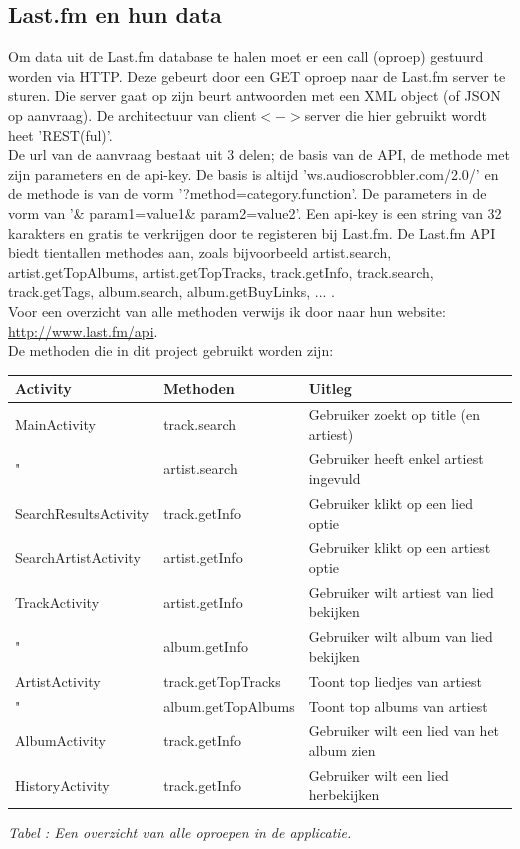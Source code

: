 \documentclass[11pt,a4paper]{article}
\newcounter{tabc}
\newcommand{\increaseTabID} {%
   \stepcounter{tabc}%
   \thetabc}
\newcommand{\tabID}[1]{\small \textit{Tabel \increaseTabID : #1} \\ \normalsize}
\begin{document}
		
			\subsection{Last.fm en hun data}
	\label{sec:Tracks omzetten}
	
Om data uit de Last.fm database te halen moet er een call (oproep) gestuurd worden via HTTP. Deze gebeurt door een GET oproep naar de Last.fm server te sturen. Die server gaat op zijn beurt antwoorden met een XML object (of JSON op aanvraag). De architectuur van client$<->$server die hier gebruikt wordt heet 'REST(ful)'. \\

De url van de aanvraag bestaat uit 3 delen; de basis van de API, de methode met zijn parameters en de api-key. De basis is altijd 'ws.audioscrobbler.com/2.0/' en de methode is van de vorm '?method=category.function'. De parameters in de vorm van '\& param1=value1\& param2=value2'. Een api-key is een string van 32 karakters en gratis te verkrijgen door te registeren bij Last.fm.
De Last.fm API biedt tientallen methodes aan, zoals bijvoorbeeld artist.search, artist.getTopAlbums, artist.getTopTracks, track.getInfo, track.search, track.getTags, album.search, album.getBuyLinks, ... . \\
Voor een overzicht van alle methoden verwijs ik door naar hun website: \url{http://www.last.fm/api}. \\ 

De methoden die in dit project gebruikt worden zijn: \\

\hspace{-3em} \begin{tabular}{| l | l | l |}
\hline
	Activity 				&	Methoden			& Uitleg \\ \hline
	MainActivity			&	track.search 		& Gebruiker zoekt op title (en artiest) \\
	"						&	artist.search 		& Gebruiker heeft enkel artiest ingevuld \\ \hline
	SearchResultsActivity	&	track.getInfo		& Gebruiker klikt op een lied optie \\ \hline
	SearchArtistActivity	&	artist.getInfo		& Gebruiker klikt op een artiest optie \\ \hline
	TrackActivity			&	artist.getInfo		& Gebruiker wilt artiest van lied bekijken \\
	"						&	album.getInfo		& Gebruiker wilt album van lied bekijken \\ \hline
	ArtistActivity			&	track.getTopTracks	& Toont top liedjes van artiest \\
	"						&	album.getTopAlbums	& Toont top albums van artiest  \\ \hline
	AlbumActivity			&	track.getInfo		& Gebruiker wilt een lied van het album zien \\
	HistoryActivity			&	track.getInfo		& Gebruiker wilt een lied herbekijken \\
\hline
\end{tabular}
	\tabID{Een overzicht van alle oproepen in de applicatie.} 
\end{document}
